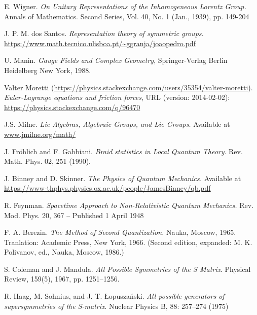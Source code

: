 \documentclass[a4paper,12pt]{scrbook}
\begin{document}
\begin{thebibliography}{9}
   E. Wigner.
    \textit{On Unitary Representations of the Inhomogeneous Lorentz Group.}
    Annals of Mathematics. Second Series, Vol. 40, No. 1 (Jan., 1939), pp. 149-204

   J. P. M. dos Santos.
    \textit{Representation theory of symmetric groups.}
    \url{https://www.math.tecnico.ulisboa.pt/~ggranja/joaopedro.pdf}

   U. Manin.
    \textit{Gauge Fields and Complex Geometry},
    Springer-Verlag Berlin Heidelberg New York, 1988.

   Valter Moretti (\url{https://physics.stackexchange.com/users/35354/valter-moretti}).
    \textit{Euler-Lagrange equations and friction forces},
    URL (version: 2014-02-02): \url{https://physics.stackexchange.com/q/96470}

   J.S. Milne.
    \textit{Lie Algebras, Algebraic Groups, and Lie Groups.}
    Available at \url{www.jmilne.org/math/}

   J. Fr\"{o}hlich and F. Gabbiani.
    \textit{Braid statistics in Local Quantum Theory}.
    Rev. Math. Phys. 02, 251 (1990).

   J. Binney and D. Skinner.
    \textit{The Physics of Quantum Mechanics.}
    Available at \url{https://www-thphys.physics.ox.ac.uk/people/JamesBinney/qb.pdf}

   R. Feynman.
    \textit{Spacetime Approach to Non-Relativistic Quantum Mechanics.}
    Rev. Mod. Phys. 20, 367 – Published 1 April 1948

   F. A. Berezin.
    \textit{The Method of Second Quantization.}
    Nauka, Moscow, 1965. Tranlation: Academic Press, New York, 1966. (Second edition, expanded: M. K. Polivanov, ed., Nauka, Moscow, 1986.)

   S. Coleman and J. Mandula.
    \textit{All Possible Symmetries of the S Matrix}.
    Physical Review, 159(5), 1967, pp. 1251–1256.

   R. Haag, M. Sohnius, and J. T. {\L}opusza\'{n}ski.
    \textit{All possible generators of supersymmetries of the S-matrix}.
    Nuclear Physics B, 88: 257–274 (1975)
\end{thebibliography}
\end{document}
